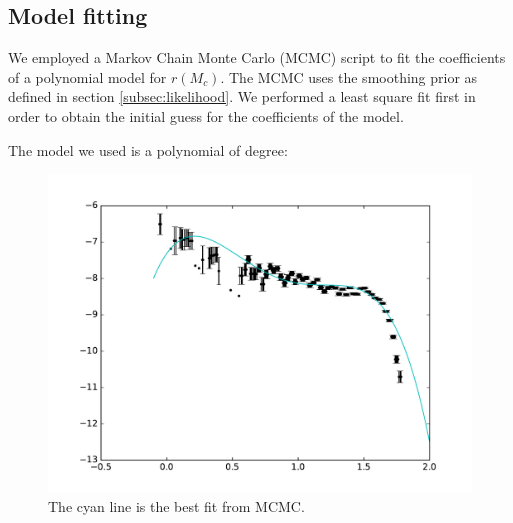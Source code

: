 \subsection{Model fitting}
\label{subsec:fitting}
We employed a Markov Chain Monte Carlo (MCMC) script to fit the coefficients of a polynomial model for $r(M_c)$. The MCMC uses the smoothing prior as defined in section \ref{subsec:likelihood}. We performed a least square fit first in order to obtain the initial guess for the coefficients of the model.

The model we used is a polynomial of degree:
\begin{figure}[ht]
  \includegraphics[width=\columnwidth]{img/line-MCMC.pdf}
  \caption{The cyan line is the best fit from MCMC.}
  \label{fig:line_MCMC}
\end{figure}